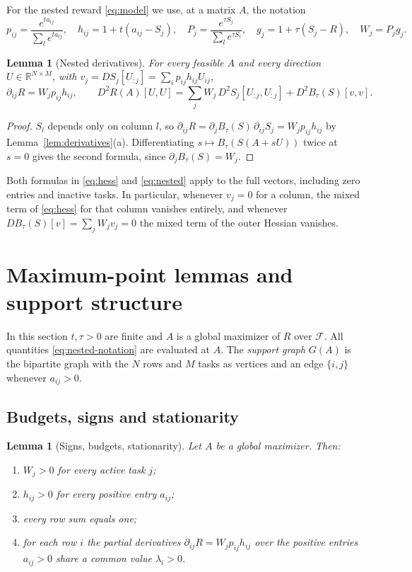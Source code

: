 \documentclass[11pt]{article}
\theoremstyle{plain}
\newtheorem{lemma}[theorem]{Lemma}
\theoremstyle{definition}
\theoremstyle{remark}
\newcommand{\R}{\mathbb{R}}
\newcommand{\Feas}{\mathcal{F}}
\begin{document}
For the nested reward \eqref{eq:model} we use, at a matrix $A$, the notation
\begin{equation}\label{eq:nested-notation}
 p_{ij}=\frac{e^{ta_{ij}}}{\sum_le^{ta_{lj}}},\quad h_{ij}=1+t(a_{ij}-S_j),\quad
 P_j=\frac{e^{\tau S_j}}{\sum_le^{\tau S_l}},\quad g_j=1+\tau(S_j-R),\quad W_j=P_jg_j .
\end{equation}

\begin{lemma}[Nested derivatives]\label{lem:nested}
For every feasible $A$ and every direction $U\in\R^{N\times M}$, with $v_j=DS_j[U_{:j}]=\sum_ip_{ij}h_{ij}U_{ij}$,
\begin{equation}\label{eq:nested}
 \partial_{ij}R=W_jp_{ij}h_{ij},\qquad
 D^2R(A)[U,U]=\sum_jW_j\,D^2S_j[U_{:j},U_{:j}]+D^2B_\tau(S)[v,v].
\end{equation}
\end{lemma}

\begin{proof}
$S_l$ depends only on column $l$, so $\partial_{ij}R=\partial_jB_\tau(S)\,\partial_{ij}S_j=W_jp_{ij}h_{ij}$ by Lemma~\ref{lem:derivatives}(a). Differentiating $s\mapsto B_\tau(S(A+sU))$ twice at $s=0$ gives the second formula, since $\partial_jB_\tau(S)=W_j$.
\end{proof}

Both formulas in \eqref{eq:hess} and \eqref{eq:nested} apply to the full vectors, including zero entries and inactive tasks. In particular, whenever $v_j=0$ for a column, the mixed term of \eqref{eq:hess} for that column vanishes entirely, and whenever $DB_\tau(S)[v]=\sum_jW_jv_j=0$ the mixed term of the outer Hessian vanishes.

\section{Maximum-point lemmas and support structure}\label{sec:lemmas}

In this section $t,\tau>0$ are finite and $A$ is a global maximizer of $R$ over $\Feas$. All quantities \eqref{eq:nested-notation} are evaluated at $A$. The \emph{support graph} $G(A)$ is the bipartite graph with the $N$ rows and $M$ tasks as vertices and an edge $\{i,j\}$ whenever $a_{ij}>0$.

\subsection{Budgets, signs and stationarity}

\begin{lemma}[Signs, budgets, stationarity]\label{lem:signs}
Let $A$ be a global maximizer. Then:
\begin{enumerate}[nosep,label=(\alph*)]
\item $W_j>0$ for every active task $j$;
\item $h_{ij}>0$ for every positive entry $a_{ij}$;
\item every row sum equals one;
\item for each row $i$ the partial derivatives $\partial_{ij}R=W_jp_{ij}h_{ij}$ over the positive entries $a_{ij}>0$ share a common value $\lambda_i>0$.
\end{enumerate}
\end{lemma}
\end{document}
